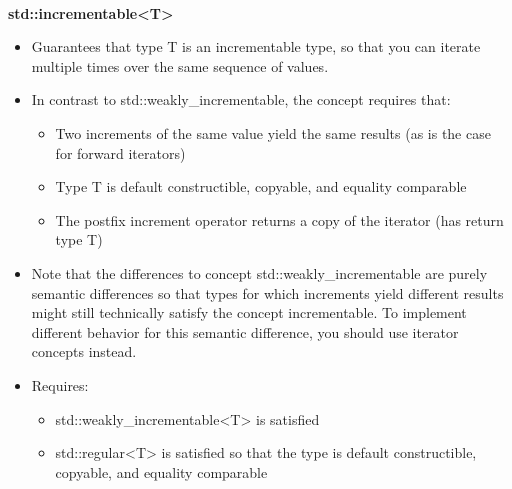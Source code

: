 \noindent
\hspace*{\fill} \\ %
\textbf{std::incrementable<T>}

\begin{itemize}
\item
Guarantees that type T is an incrementable type, so that you can iterate multiple times over the same sequence of values.

\item
In contrast to std::weakly\_incrementable, the concept requires that:

\begin{itemize}
\item
Two increments of the same value yield the same results (as is the case for forward iterators)

\item
Type T is default constructible, copyable, and equality comparable

\item
The postfix increment operator returns a copy of the iterator (has return type T)
\end{itemize}

\item
Note that the differences to concept std::weakly\_incrementable are purely semantic differences so that types for which increments yield different results might still technically satisfy the concept incrementable. To implement different behavior for this semantic difference, you should use iterator concepts instead.

\item
Requires:
\begin{itemize}
\item
std::weakly\_incrementable<T> is satisfied

\item
std::regular<T> is satisfied so that the type is default constructible, copyable, and equality comparable
\end{itemize}
\end{itemize}
